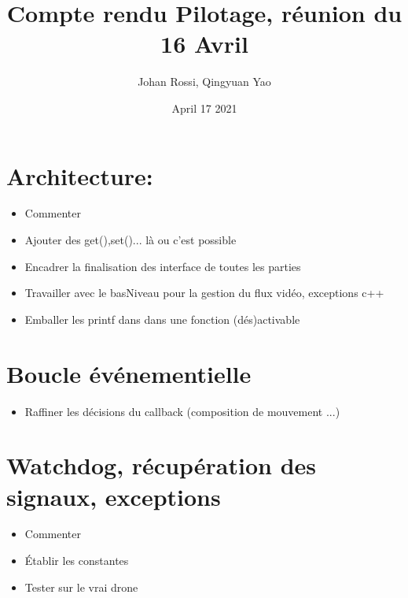 \documentclass{article}
\title{Compte rendu Pilotage, réunion du 16 Avril}
\author{Johan Rossi, Qingyuan Yao}
\date{April 17 2021}
\begin{document}
\maketitle

\section{Architecture:}
\begin{itemize}
    \item Commenter
    \item Ajouter des get(),set()... là ou c'est possible
    \item Encadrer la finalisation des interface de toutes les parties
    \item Travailler avec le basNiveau pour la gestion du flux vidéo, exceptions c++
    \item Emballer les printf dans dans une fonction (dés)activable 
\end{itemize}

\section{Boucle événementielle}
\begin{itemize}
    \item Raffiner les décisions du callback (composition de mouvement ...)
\end{itemize}

\section{Watchdog, récupération des signaux, exceptions}
\begin{itemize}
    \item Commenter
    \item Établir les constantes
    \item Tester sur le vrai drone
\end{itemize}
    
\end{document}
